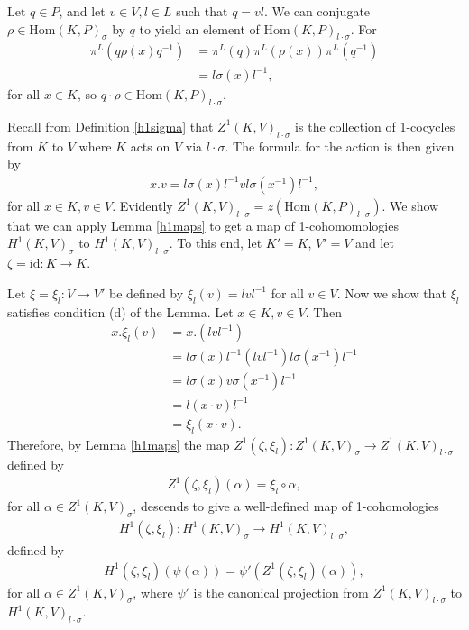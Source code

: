 Let $q \in P$, and let $v \in V, l \in L$ such that $q = vl$. We can conjugate $\rho \in \mathrm{Hom}(K, P)_\sigma$ by $q$ to yield an element of $\mathrm{Hom}(K, P)_{l \cdot \sigma}$. For
\begin{align*}%
\pi^L\left(q \rho(x) q^{-1}\right)%
&= \pi^L\left(q\right) \pi^L\left(\rho(x)\right) \pi^L\left(q^{-1}\right) \\
&= l \sigma(x) l^{-1},
\end{align*}
for all $x \in K$, so $q \cdot \rho \in \mathrm{Hom}(K, P)_{l\cdot \sigma}$.

Recall from Definition \ref{h1sigma} that $Z^1(K, V)_{l \cdot \sigma}$ is the collection of 1-cocycles from $K$ to $V$ where $K$ acts on $V$ via $l \cdot \sigma$. The formula for the action is then given by
\begin{align*}
	x.v = l \sigma(x) l^{-1} v l \sigma(x^{-1}) l^{-1},
\end{align*}
for all $x \in K, v \in V$. Evidently $Z^1(K, V)_{l \cdot \sigma} = z\left(\mathrm{Hom}(K, P)_{l \cdot \sigma}\right)$. 
We show that we can apply Lemma \ref{h1maps} to get a map of 1-cohomomologies $H^1(K, V)_\sigma$ to $H^1(K, V)_{l \cdot \sigma}$. To this end, let $K' = K$, $V' = V$ and let $\zeta = \mathrm{id}:K \rightarrow K$.

Let $\xi = \xi_l: V \rightarrow V'$ be defined by	$\xi_l(v) = lvl^{-1}$ for all $v \in V$. Now we show that $\xi_l$ satisfies condition (d) of the Lemma. Let $x \in K, v \in V$. Then
	\begin{align*}
		x . \xi_l(v) &= x . \left(lvl^{-1}\right) \\
		&= l\sigma(x)l^{-1} \left(lvl^{-1}\right) l\sigma(x^{-1})l^{-1} \\
		&= l\sigma(x)v\sigma(x^{-1})l^{-1} \\
		&= l\left(x \cdot v \right)l^{-1} \\
		&= \xi_l \left(x \cdot v \right).
	\end{align*}
	Therefore, by Lemma \ref{h1maps} the map $Z^1(\zeta, \xi_l):Z^1(K, V)_\sigma \rightarrow Z^1(K, V)_{l \cdot \sigma}$ defined by 
	\begin{align*}
		Z^1(\zeta, \xi_l)(\alpha) = \xi_l \circ \alpha,
	\end{align*}
	for all $\alpha \in Z^1(K, V)_\sigma$,
	descends to give a well-defined map of 1-cohomologies
	\begin{align*}
		H^1(\zeta, \xi_l):H^1(K, V)_\sigma \rightarrow H^1(K, V)_{l \cdot \sigma},
	\end{align*}
	defined by
	\begin{align*}
		H^1(\zeta, \xi_l)\left(\psi(\alpha)\right) = \psi'\left(Z^1(\zeta, \xi_l)(\alpha)\right),
	\end{align*}
	for all $\alpha \in Z^1(K, V)_\sigma$,
	where $\psi'$ is the canonical projection from $Z^1(K, V)_{l \cdot \sigma}$ to $H^1(K, V)_{l \cdot \sigma}$.

